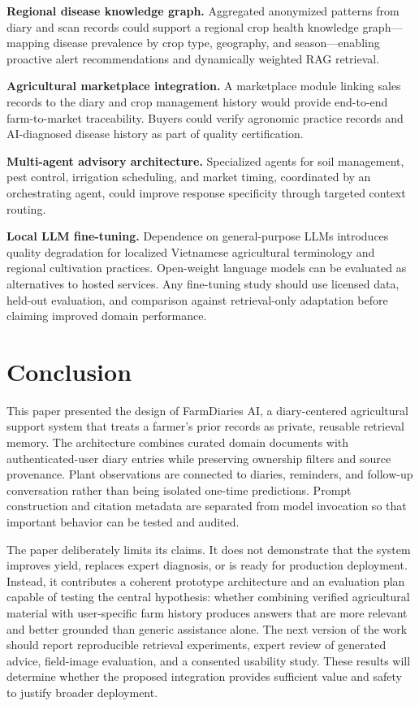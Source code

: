 \documentclass[conference]{IEEEtran}
\begin{document}
\textbf{Regional disease knowledge graph.} Aggregated anonymized patterns from diary and scan records could support a regional crop health knowledge graph---mapping disease prevalence by crop type, geography, and season---enabling proactive alert recommendations and dynamically weighted RAG retrieval.

\textbf{Agricultural marketplace integration.} A marketplace module linking sales records to the diary and crop management history would provide end-to-end farm-to-market traceability. Buyers could verify agronomic practice records and AI-diagnosed disease history as part of quality certification.

\textbf{Multi-agent advisory architecture.} Specialized agents for soil management, pest control, irrigation scheduling, and market timing, coordinated by an orchestrating agent, could improve response specificity through targeted context routing.

\textbf{Local LLM fine-tuning.} Dependence on general-purpose LLMs introduces quality degradation for localized Vietnamese agricultural terminology and regional cultivation practices. Open-weight language models can be evaluated as alternatives to hosted services. Any fine-tuning study should use licensed data, held-out evaluation, and comparison against retrieval-only adaptation before claiming improved domain performance.

\section{Conclusion}

This paper presented the design of FarmDiaries AI, a diary-centered agricultural support system that treats a farmer's prior records as private, reusable retrieval memory. The architecture combines curated domain documents with authenticated-user diary entries while preserving ownership filters and source provenance. Plant observations are connected to diaries, reminders, and follow-up conversation rather than being isolated one-time predictions. Prompt construction and citation metadata are separated from model invocation so that important behavior can be tested and audited.

The paper deliberately limits its claims. It does not demonstrate that the system improves yield, replaces expert diagnosis, or is ready for production deployment. Instead, it contributes a coherent prototype architecture and an evaluation plan capable of testing the central hypothesis: whether combining verified agricultural material with user-specific farm history produces answers that are more relevant and better grounded than generic assistance alone. The next version of the work should report reproducible retrieval experiments, expert review of generated advice, field-image evaluation, and a consented usability study. These results will determine whether the proposed integration provides sufficient value and safety to justify broader deployment.
\end{document}
